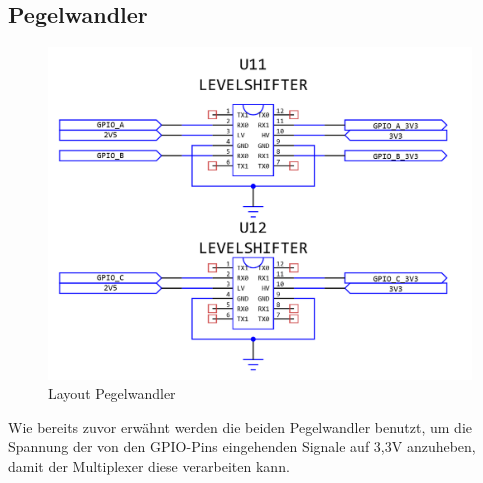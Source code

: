\subsection{Pegelwandler}\label{subsec:Pegelwandler}
\begin{figure}[H]
	\includegraphics[width=\textwidth]{images/Layout_LevelShifter.png}	
	\caption{Layout Pegelwandler}
	\label{fig:Layout_LevelShifter}
\end{figure}
Wie bereits zuvor erwähnt werden die beiden Pegelwandler benutzt, um die Spannung der von den \acs{GPIO}-Pins eingehenden Signale auf 3,3V anzuheben, damit der Multiplexer diese verarbeiten kann.
